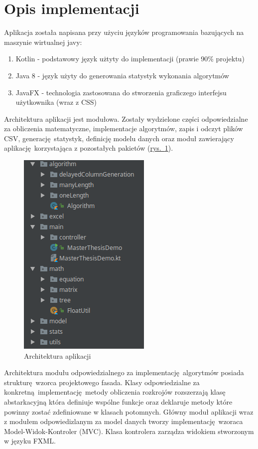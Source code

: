 \section{Opis implementacji}
Aplikacja została napisana przy użyciu języków programowania bazujących na maszynie wirtualnej javy:
\begin{enumerate}
  \item Kotlin - podstawowy język użtyty do implementacji (prawie 90\% projektu)
  \item Java 8 - język użyty do generowania statystyk wykonania algorytmów
  \item JavaFX - technologia zastosowana do stworzenia graficzego interfejsu użytkownika (wraz z CSS)
\end{enumerate}

Architektura aplikacji jest modułowa. Zostały wydzielone części odpowiedzialne za obliczenia matematyczne, implementacje algorytmów, zapis i odczyt plików CSV, generację statystyk, definicję modelu danych oraz moduł zawierający aplikację korzystająca z pozostałych pakietów (\hyperref[fig:arch]{rys.~\ref*{fig:arch}}).

\begin{figure}[h]
  \center
  \includegraphics[scale=0.7]{../image/arch.png}
  \caption{Architektura aplikacji}
  \label{fig:arch}
\end{figure}

Architektura modułu odpowiedzialnego za implementację algorytmów posiada strukturę wzorca projektowego fasada. Klasy odpowiedzialne za konkretną implementację metody obliczenia rozkrojów rozszerzają klasę abstarkacyjną która definiuje wspólne funkcje oraz deklaruje metody które powinny zostać zdefiniowane w klasach potomnych. Główny moduł aplikacji wraz z modułem odpowiedizlanym za model danych tworzy implementację wzoraca Model-Widok-Kontroler (MVC). Klasa kontrolera zarządza widokiem stworzonym w języku FXML.

